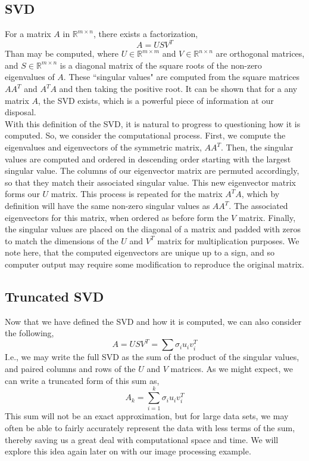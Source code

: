 \documentclass[letterpaper,12pt]{article}
\newcommand{\R}{\mathbb{R}}
\begin{document}
\subsection{SVD}
For a matrix $A$ in $\R^{m\times n}$, there exists a factorization,
\[A=USV^T\]
Than may be computed, where $U\in \R^{m\times m}$ and $V\in \R^{n\times n}$ are orthogonal matrices, and $S\in \R^{m\times n}$ is a diagonal matrix of the square roots of the non-zero eigenvalues of $A$. These ``singular values" are computed from the square matrices $AA^T$ and $A^TA$ and then taking the positive root. It can be shown that for a any matrix $A$, the SVD exists, which is a powerful piece of information at our disposal.\cite{Extra}\\
With this definition of the SVD, it is natural to progress to questioning how it is computed. So, we consider the computational process. First, we compute the eigenvalues and eigenvectors of the symmetric matrix, $AA^T$. Then, the singular values are computed and ordered in descending order starting with the largest singular value. The columns of our eigenvector matrix are permuted accordingly, so that they match their associated singular value. This new eigenvector matrix forms our $U$ matrix. This process is repeated for the matrix $A^TA$, which by definition will have the same non-zero singular values as $AA^T$. The associated eigenvectors for this matrix, when ordered as before form the $V$ matrix. Finally, the singular values are placed on the diagonal of a matrix and padded with zeros to match the dimensions of the $U$ and $V^T$ matrix for multiplication purposes. We note here, that the computed eigenvectors are unique up to a sign, and so computer output may require some modification to reproduce the original matrix.\cite{SVDHowTo}
\subsection{Truncated SVD}
Now that we have defined the SVD and how it is computed, we can also consider the following,
\[A=USV^T=\sum\sigma_iu_iv^T_i\]
I.e., we may write the full SVD as the sum of the product of the singular values, and paired columns and rows of the $U$ and $V$ matrices. As we might expect, we can write a truncated form of this sum as,
\[A_k = \sum_{i=1}^k\sigma_iu_iv^T_i\]
This sum will not be an exact approximation, but for large data sets, we may often be able to fairly accurately represent the data with less terms of the sum, thereby saving us a great deal with computational space and time. We will explore this idea again later on with our image processing example.\cite{Extra}
\end{document}
